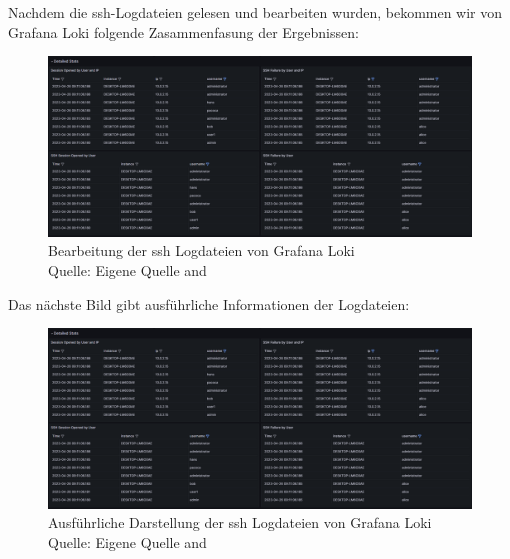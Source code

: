 \newpage
{} 
\thispagestyle{lscape}
\begin{landscape}
   Nachdem die \gls{ssh}-Logdateien gelesen und bearbeiten wurden, bekommen wir von Grafana Loki folgende Zasammenfasung der Ergebnissen:
    \begin{figure}[H]
        \centerline{\includegraphics[width=1.7\textwidth]{assets/GrafanaLoki_sshDetailed.png}}
        \caption[Bearbeitung der \gls{ssh} Logdateien von Grafana Loki]
        {Bearbeitung der \gls{ssh} Logdateien von Grafana Loki\\Quelle: Eigene Quelle and \citep{VoidQuark_sshlogs}}
        \centering
    \end{figure} 
\end{landscape}
\restoregeometry


\newpage
{} 
\thispagestyle{lscape}
\begin{landscape}
   Das nächste Bild gibt ausführliche Informationen der Logdateien:
    \begin{figure}[H]
        \centerline{\includegraphics[width=1.7\textwidth]{assets/GrafanaLoki_sshDetailed.png}}
        \caption[Ausführliche Darstellung der \gls{ssh} Logdateien von Grafana Loki]
        {Ausführliche Darstellung der \gls{ssh} Logdateien von Grafana Loki\\Quelle: Eigene Quelle and \citep{VoidQuark_sshlogs}}
        \centering
    \end{figure} 
\end{landscape}
\restoregeometry

